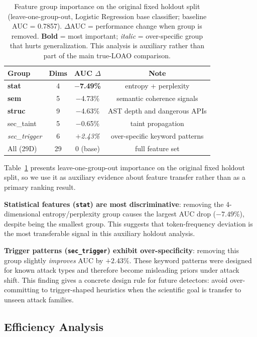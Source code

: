 ﻿\documentclass[sigconf,review,anonymous]{acmart}
\begin{document}
\begin{table}[t]
\centering
\caption{Feature group importance on the original fixed holdout split
(leave-one-group-out, Logistic Regression base classifier; baseline AUC =
0.7857). $\Delta$AUC = performance change when group is removed.
\textbf{Bold} = most important; \textit{italic} = over-specific group
that hurts generalization. This analysis is auxiliary rather than part of the
main true-LOAO comparison.}
\label{tab:feat}
\small
\begin{tabular}{lccc}
\toprule
Group & Dims & AUC $\Delta$ & Note \\
\midrule
\textbf{stat}       & 4  & \textbf{$-$7.49\%} & entropy + perplexity \\
\textbf{sem}        & 5  & $-$4.73\%          & semantic coherence signals \\
\textbf{struc}      & 9  & $-$4.63\%          & AST depth and dangerous APIs \\
sec\_taint          & 5  & $-$0.65\%          & taint propagation \\
\textit{sec\_trigger} & 6 & \textit{$+$2.43\%} & over-specific keyword patterns \\
\midrule
All (29D)           & 29 & 0 (base)           & full feature set \\
\bottomrule
\end{tabular}
\end{table}

Table~\ref{tab:feat} presents leave-one-group-out importance on
the original fixed holdout split, so we use it as auxiliary evidence
about feature transfer rather than as a primary ranking result.

\textbf{Statistical features (\texttt{stat}) are most discriminative}: removing
the 4-dimensional entropy/perplexity group causes the largest AUC drop ($-7.49\%$),
despite being the smallest group. This suggests that token-frequency deviation
is the most transferable signal in this auxiliary holdout analysis.

\textbf{Trigger patterns (\texttt{sec\_trigger}) exhibit over-specificity}:
removing this group slightly \emph{improves} AUC by $+2.43\%$.
These keyword patterns were designed for known attack types and therefore become
misleading priors under attack shift. This finding gives a concrete design rule
for future detectors: avoid over-committing to trigger-shaped heuristics when
the scientific goal is transfer to unseen attack families.

\subsection{Efficiency Analysis}
\label{sec:exp:eff}
\end{document}
